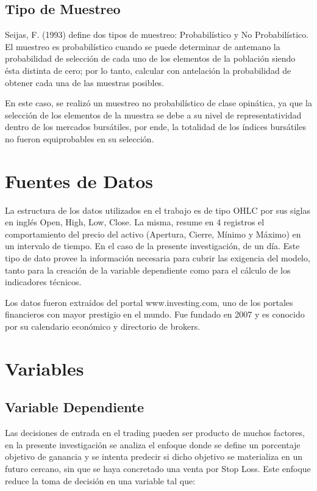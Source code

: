 \documentclass[a4paper,12pt]{Latex/Classes/PhDthesisPSnPDF}
\begin{document}
\subsection{Tipo de Muestreo}

Seijas, F. (1993) define dos tipos de muestreo: Probabilístico y No Probabilístico.  El muestreo es probabilístico cuando se puede determinar de antemano la probabilidad de selección de cada uno de los elementos de la población siendo ésta distinta de cero; por lo tanto, calcular con antelación la probabilidad de obtener cada una de las muestras posibles.

En este caso, se realizó un muestreo no probabilístico de clase opinática, ya que la selección de los elementos de la muestra se debe a su nivel de representatividad dentro de los mercados bursátiles, por ende, la totalidad de los índices bursátiles no fueron equiprobables en su selección.

\section{Fuentes de Datos}

La estructura de los datos utilizados en el trabajo es de tipo OHLC por sus siglas en inglés Open, High, Low, Close. La misma, resume en 4 registros el comportamiento del precio del activo (Apertura, Cierre, Mínimo y Máximo) en un intervalo de tiempo. En el caso de la presente investigación, de un día. Este tipo de dato provee la información necesaria para cubrir las exigencia del modelo, tanto para la creación de la variable dependiente como para el cálculo de los indicadores técnicos.

Los datos fueron extraídos del portal www.investing.com, uno de los portales financieros con mayor prestigio en el mundo. Fue fundado en 2007 y es conocido por su calendario económico y directorio de brokers.

\section{Variables}

\subsection{Variable Dependiente}

Las decisiones de entrada en el trading pueden ser producto de muchos factores, en la presente investigación se analiza el enfoque donde se define un porcentaje objetivo de ganancia y se intenta predecir si dicho objetivo se materializa en un futuro cercano, sin que se haya concretado una venta por Stop Loss. Este enfoque reduce la toma de decisión en una variable tal que:
\end{document}
